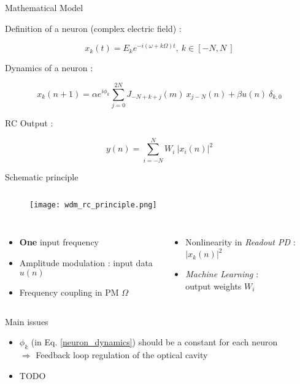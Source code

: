\begin{frame}{Mathematical Model}

	Definition of a neuron (complex electric field) :
	
	\begin{equation}
		x_k(t)=E_k e^{-i(\omega+k \Omega)t},~ k \in [-N,N~]
	\end{equation}
	
	Dynamics of a neuron :
	
	\begin{equation}
		x_k(n+1)= \alpha e^{i\phi_k}\sum_{j=0}^{2N} J_{-N+k+j}(m) ~x_{j-N}(n) + \beta u(n)~ \delta_{k,0}
		\label{neuron_dynamics}
	\end{equation}
	
	RC Output :
	
	\begin{equation}
		y(n)=\sum_{i=-N}^{N} W_i ~|x_i(n)|^2
	\end{equation}
	
\end{frame}


\begin{frame}{Schematic principle}

	\begin{figure}
		\begin{columns}
			\texttt{[image: wdm\_rc\_principle.png]}
			\caption{\cite{AkroutAkram2016Pprc}}
		\end{columns}
	\end{figure}
	
	\begin{columns}
		\begin{column}{0.5\textwidth}
			\begin{itemize}
				\item \textbf{One} input frequency
				\item Amplitude modulation : input data $u(n)$
				\item Frequency coupling in PM $\Omega$
			\end{itemize}
		\end{column}
		\begin{column}{0.5\textwidth}
			\begin{itemize}
				\item Nonlinearity in \emph{Readout PD} : $|x_k(n)|^2$
				\item \textit{Machine Learning} : \\output weights $W_i$
			\end{itemize}
		\end{column}
	\end{columns}
\end{frame}

\begin{frame}[allowframebreaks]{Main issues}
	\begin{itemize}
		\item $\phi_k$ (in Eq. \ref{neuron_dynamics}) should be a constant for each neuron\\ $\Longrightarrow$ \alert{Feedback loop regulation} of the optical cavity
		\item \alert{TODO}
	\end{itemize}
	
\end{frame}
